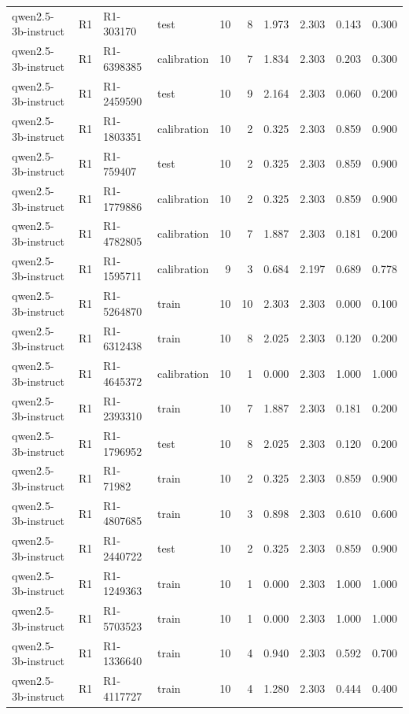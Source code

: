 \begin{table}
\begin{tabular}{llllrrrrrr}
qwen2.5-3b-instruct & R1 & R1-303170 & test & 10 & 8 & 1.973 & 2.303 & 0.143 & 0.300 \\
qwen2.5-3b-instruct & R1 & R1-6398385 & calibration & 10 & 7 & 1.834 & 2.303 & 0.203 & 0.300 \\
qwen2.5-3b-instruct & R1 & R1-2459590 & test & 10 & 9 & 2.164 & 2.303 & 0.060 & 0.200 \\
qwen2.5-3b-instruct & R1 & R1-1803351 & calibration & 10 & 2 & 0.325 & 2.303 & 0.859 & 0.900 \\
qwen2.5-3b-instruct & R1 & R1-759407 & test & 10 & 2 & 0.325 & 2.303 & 0.859 & 0.900 \\
qwen2.5-3b-instruct & R1 & R1-1779886 & calibration & 10 & 2 & 0.325 & 2.303 & 0.859 & 0.900 \\
qwen2.5-3b-instruct & R1 & R1-4782805 & calibration & 10 & 7 & 1.887 & 2.303 & 0.181 & 0.200 \\
qwen2.5-3b-instruct & R1 & R1-1595711 & calibration & 9 & 3 & 0.684 & 2.197 & 0.689 & 0.778 \\
qwen2.5-3b-instruct & R1 & R1-5264870 & train & 10 & 10 & 2.303 & 2.303 & 0.000 & 0.100 \\
qwen2.5-3b-instruct & R1 & R1-6312438 & train & 10 & 8 & 2.025 & 2.303 & 0.120 & 0.200 \\
qwen2.5-3b-instruct & R1 & R1-4645372 & calibration & 10 & 1 & 0.000 & 2.303 & 1.000 & 1.000 \\
qwen2.5-3b-instruct & R1 & R1-2393310 & train & 10 & 7 & 1.887 & 2.303 & 0.181 & 0.200 \\
qwen2.5-3b-instruct & R1 & R1-1796952 & test & 10 & 8 & 2.025 & 2.303 & 0.120 & 0.200 \\
qwen2.5-3b-instruct & R1 & R1-71982 & train & 10 & 2 & 0.325 & 2.303 & 0.859 & 0.900 \\
qwen2.5-3b-instruct & R1 & R1-4807685 & train & 10 & 3 & 0.898 & 2.303 & 0.610 & 0.600 \\
qwen2.5-3b-instruct & R1 & R1-2440722 & test & 10 & 2 & 0.325 & 2.303 & 0.859 & 0.900 \\
qwen2.5-3b-instruct & R1 & R1-1249363 & train & 10 & 1 & 0.000 & 2.303 & 1.000 & 1.000 \\
qwen2.5-3b-instruct & R1 & R1-5703523 & train & 10 & 1 & 0.000 & 2.303 & 1.000 & 1.000 \\
qwen2.5-3b-instruct & R1 & R1-1336640 & train & 10 & 4 & 0.940 & 2.303 & 0.592 & 0.700 \\
qwen2.5-3b-instruct & R1 & R1-4117727 & train & 10 & 4 & 1.280 & 2.303 & 0.444 & 0.400 \\

\end{tabular}
\end{table}
